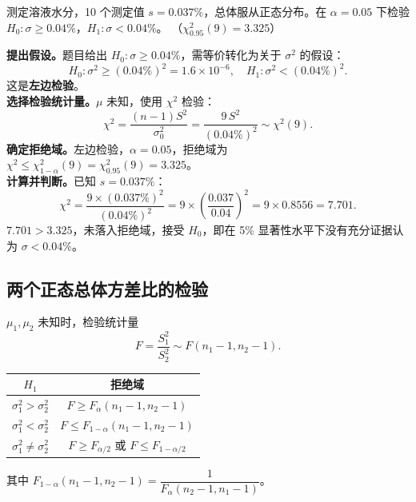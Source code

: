 \documentclass[lang=cn,11pt]{elegantbook}
\begin{document}
\begin{exercise}\label{exer:9-chi2-left}
测定溶液水分，10 个测定值 \(s=0.037\%\)，总体服从正态分布。在 \(\alpha=0.05\) 下检验 \(H_0\colon \sigma \geq 0.04\%\)，\(H_1\colon \sigma < 0.04\%\)。
（\(\chi^2_{0.95}(9)=3.325\)）
\end{exercise}
\begin{solution}
\textbf{提出假设。}题目给出 \(H_0\colon \sigma \geq 0.04\%\)，需等价转化为关于 \(\sigma^2\) 的假设：
\[
H_0\colon \sigma^2 \geq (0.04\%)^2 = 1.6\times10^{-6},\quad H_1\colon \sigma^2 < (0.04\%)^2.
\]
这是\textbf{左边检验}。\\
\textbf{选择检验统计量。}\(\mu\) 未知，使用 \(\chi^2\) 检验：
\[
\chi^2 = \frac{(n-1)S^2}{\sigma_0^2} = \frac{9\,S^2}{(0.04\%)^2} \sim \chi^2(9).
\]
\textbf{确定拒绝域。}左边检验，\(\alpha=0.05\)，拒绝域为 \(\chi^2 \leq \chi^2_{1-\alpha}(9) = \chi^2_{0.95}(9) = 3.325\)。\\
\textbf{计算并判断。}已知 \(s=0.037\%\)：
\[
\chi^2 = \frac{9 \times (0.037\%)^2}{(0.04\%)^2} = 9 \times \left(\frac{0.037}{0.04}\right)^{\!2} = 9 \times 0.8556 = 7.701.
\]
\(7.701 > 3.325\)，未落入拒绝域，接受 \(H_0\)，即在 5\% 显著性水平下没有充分证据认为 \(\sigma < 0.04\%\)。
\end{solution}



\subsection{两个正态总体方差比的检验}

\begin{property}[F 检验]\label{prop:f-test}
\(\mu_1, \mu_2\) 未知时，检验统计量
\[
F = \frac{S_1^2}{S_2^2} \sim F(n_1-1, n_2-1).
\]
\begin{center}
\begin{tabular}{cc}
\toprule
\(H_1\) & 拒绝域 \\
\midrule
\(\sigma_1^2 > \sigma_2^2\) & \(F \geq F_\alpha(n_1-1, n_2-1)\) \\[4pt]
\(\sigma_1^2 < \sigma_2^2\) & \(F \leq F_{1-\alpha}(n_1-1, n_2-1)\) \\[4pt]
\(\sigma_1^2 \neq \sigma_2^2\) & \(F \geq F_{\alpha/2}\) 或 \(F \leq F_{1-\alpha/2}\) \\
\bottomrule
\end{tabular}
\end{center}
其中 \(F_{1-\alpha}(n_1-1,n_2-1) = \dfrac{1}{F_\alpha(n_2-1,n_1-1)}\)。
\end{property}
\end{document}
